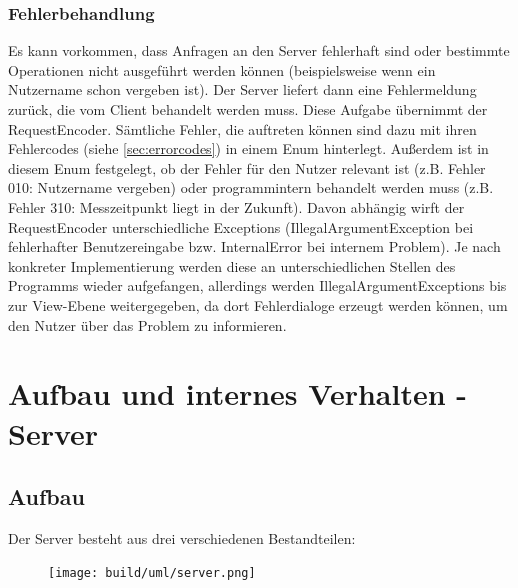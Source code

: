 \documentclass[parskip=full,11pt]{scrartcl}
\begin{document}
\subsubsection{Fehlerbehandlung} \label{sec:error}

Es kann vorkommen, dass Anfragen an den Server fehlerhaft sind oder bestimmte
Operationen nicht ausgeführt werden können (beispielsweise wenn ein Nutzername
schon vergeben ist). Der Server liefert dann eine Fehlermeldung zurück, die vom
Client behandelt werden muss. Diese Aufgabe übernimmt der RequestEncoder.
Sämtliche Fehler, die auftreten können sind dazu mit ihren Fehlercodes (siehe
\ref{sec:errorcodes}) in einem Enum hinterlegt. Außerdem ist in diesem Enum
festgelegt, ob der Fehler für den Nutzer relevant ist (z.B. Fehler 010:
Nutzername vergeben) oder programmintern behandelt werden muss (z.B. Fehler
310: Messzeitpunkt liegt in der Zukunft). Davon abhängig wirft der
RequestEncoder unterschiedliche Exceptions (IllegalArgumentException bei
fehlerhafter Benutzereingabe bzw. InternalError bei internem Problem). Je nach
konkreter Implementierung werden diese an unterschiedlichen Stellen des
Programms wieder aufgefangen, allerdings werden IllegalArgumentExceptions bis
zur View-Ebene weitergegeben, da dort Fehlerdialoge erzeugt werden können, um
den Nutzer über das Problem zu informieren.




\pagebreak
\section{Aufbau und internes Verhalten - Server}

\subsection{Aufbau}
Der Server besteht aus drei verschiedenen Bestandteilen:

\begin{figure}[!htb]
    \centering
    \texttt{[image: build/uml/server.png]}
	\label{fig:serverclassdiagram}
\end{figure}
\end{document}
